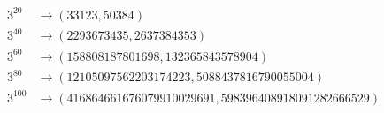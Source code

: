 \documentclass[11pt]{article}
\begin{document}
\begin{equation*}
\begin{split}
3^{20}  &\rightarrow (33123, 50384) \\
3^{40}  &\rightarrow (2293673435, 2637384353) \\
3^{60}  &\rightarrow (158808187801698, 132365843578904) \\
3^{80}  &\rightarrow (12105097562203174223, 5088437816790055004) \\
3^{100}  &\rightarrow (416864661676079910029691, 598396408918091282666529) \\
\end{split}
\end{equation*}
\end{document}
